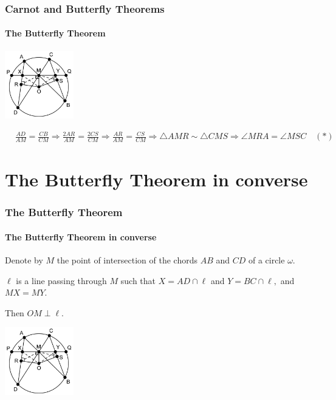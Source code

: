 \documentclass[8pt,xcolor=table,dvipsnames]{beamer}
\begin{document}
\begin{frame}[t]
    \frametitle{Carnot and Butterfly Theorems}
    \framesubtitle{The Butterfly Theorem}
    \begin{center}
        \includegraphics[width=3cm]{./png/24-25-s2-g3-p1.png}
    \end{center}
    \[
        \begin{aligned}
            &\frac{AD}{AM} = \frac{CB}{CM} \Rightarrow \frac{2AR}{AM} = \frac{2CS}{CM} \Rightarrow \frac{AR}{AM} = \frac{CS}{CM} \Longrightarrow \triangle AMR \sim \triangle CMS
            \Rightarrow \angle MRA = \angle MSC \quad (*)
        \end{aligned}
    \]
    
    \bigbreak

    \bigbreak

\end{frame}

\section{The Butterfly Theorem in converse}

\begin{frame}[t]
    \frametitle{The Butterfly Theorem}
    \framesubtitle{The Butterfly Theorem in converse}
    \begin{theorem}
        Denote by $M$ the point of intersection of the chords $AB$ and $CD$ of a circle $\omega.$
        
        \bigbreak
        $\ell$ is a line passing through $M$ such that $X = AD\cap \ell$ and $Y = BC \cap \ell,$ and $MX = MY.$
        
        \bigbreak
        Then $OM \perp \ell.$
    \end{theorem}
    
    \begin{center}
        \includegraphics[width=3cm]{./png/24-25-s2-g3-p1.png}
    \end{center}
\end{frame}
\end{document}
